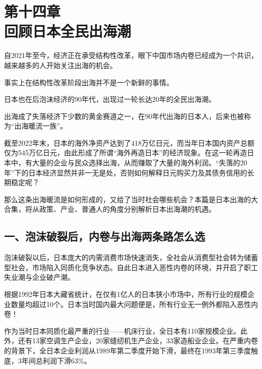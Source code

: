 

\section[第十四章\q 回顾日本全民出海潮]{第十四章\\ 回顾日本全民出海潮}


{\fangsong 自2021年至今，经济正在承受结构性改革，眼下中国市场内卷已经成为一个共识，越来越多的人开始关注出海的机会。\par}

{\fangsong 事实上在结构性改革阶段出海并不是一个新鲜的事情。\par}

{\fangsong 日本也在后泡沫经济的90年代，出现过一轮长达20年的全民出海潮。\par}

{\fangsong 出海成了失落经济下少数的黄金赛道之一，在90年代出海的日本人，后来也被称为“出海暖流一族”。\par}

截至2022年末，日本的海外净资产达到了418万亿日元，而当年日本国内资产总额仅为545万亿日元，由此形成了所谓“海外再造日本”的经济现象。在这一轮再造日本中，有大量的企业与民众选择出海，从而赚取了大量的海外利润。“失落的20年”下的日本经济显然并非一无是处，否则如何解释日元购买力及其债务信用的长期稳定呢？

那么这条出海暖流是如何形成的，又给了当时社会哪些机会？本篇是日本出海的大合集，将从政策、产业、普通人的角度分别解析日本出海潮的机遇。

\subsection{一、泡沫破裂后，内卷与出海两条路怎么选}

泡沫破裂以后，日本庞大的内需消费市场快速消失，全社会从消费型社会转为储蓄型社会，市场陷入同质化竞争状态。自此日本进入恶性内卷的环境，并开启了职工失业潮与企业破产潮。

根据1992年日本大藏省统计，在仅有1亿人的日本狭小市场中，所有行业的规模企业数量均超过10个。日本当时国内最大问题便是，所有行业无一例外都陷入恶性内卷！

作为当时日本同质化最严重的行业——机床行业，全日本有110家规模企业。此外，还有13家空调生产企业，20家缝纫机生产企业，33家造船业企业。在严重内卷的背景下，全日本企业利润从1989年第二季度开始下滑，最终在1993年第三季度触底，3年间总利润下滑63\%。

